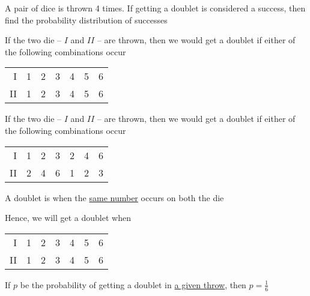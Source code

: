 \documentclass[14pt,fleqn]{extarticle}
\begin{document}
A pair of dice is thrown 4 times. If getting a 
doublet is considered a success, then find
the probability distribution of successes
%

\newcard

If the two die -- $I$ and $II$ -- are thrown, then we would get a doublet if 
either of the following combinations occur 

\begin{center}
  \begin{tabular}{N|NNNNNN}
  \toprule
    & & & & & & \\
   \midrule
   I & 1 & 2 & 3 & 4 & 5 & 6 \\      
  \midrule 
   II & 1 & 2 & 3 & 4 & 5 & 6 \\
   \bottomrule
  \end{tabular}
\end{center}

\newcard

If the two die -- $I$ and $II$ -- are thrown, then we would get a doublet if 
either of the following combinations occur 

\begin{center}
  \begin{tabular}{N|NNNNNN}
  \toprule
    & & & & & & \\
   \midrule
   I & 1 & 2 & 3 & 2 & 4 & 6 \\      
  \midrule 
   II & 2 & 4 & 6 & 1 & 2 & 3 \\
   \bottomrule
  \end{tabular}
\end{center}

\newcard 

A doublet is when the \underline{same number} occurs on both the die\newline 

Hence, we will get a doublet when 

\begin{center}
  \begin{tabular}{N|NNNNNN}
  \toprule
    & & & & & & \\
   \midrule
   I & 1 & 2 & 3 & 4 & 5 & 6 \\      
  \midrule 
   II & 1 & 2 & 3 & 4 & 5 & 6 \\
   \bottomrule
  \end{tabular}
\end{center}

\newcard 

If $p$ be the probability of getting a doublet in \underline{a given throw}, then $p= \frac{1}{6}$ 
\end{document}
